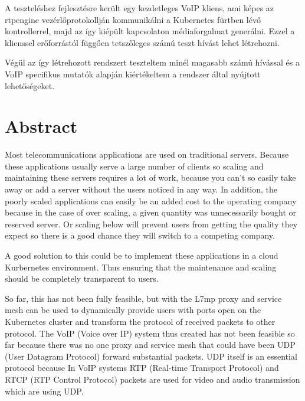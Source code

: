 A teszteléshez fejlesztésre került egy kezdetleges VoIP kliens, ami képes az 
rtpengine vezérlőprotokollján kommunikálni a Kubernetes fürtben lévő kontrollerrel, 
majd az így kiépült kapcsolaton médiaforgalmat generálni. Ezzel a klienssel 
erőforrástól függően tetszőleges számú teszt hívást lehet létrehozni. 

Végül az így létrehozott rendszert teszteltem minél magasabb számú hívással és a 
VoIP specifikus mutatók alapján kiértékeltem a rendszer által nyújtott lehetőségeket. 

\vfill
\selectenglish


\chapter*{Abstract}

Most telecommunications applications are used on traditional servers. Because these 
applications usually serve a large number of clients
so scaling and maintaining these servers requires a lot of work,
because you can’t so easily take away or add a server without the users noticed in
any way. In addition, the poorly scaled
applications can easily be an added cost to the operating company because
in the case of over scaling, a given quantity was unnecessarily bought or reserved
server. Or scaling below will prevent users from getting the quality they expect
so there is a good chance they will switch to a competing company.

A good solution to this could be to implement these applications
in a cloud Kurbernetes environment. Thus ensuring that the maintenance and
scaling should be completely transparent to users.

So far, this has not been fully feasible, but with the L7mp proxy and
service mesh can be used to dynamically provide users with ports
open on the Kubernetes cluster and transform the protocol of received packets to
other protocol. The VoIP (Voice over IP) system thus created has not been feasible so far 
because there was no one
proxy and service mesh that could have been UDP (User Datagram Protocol)
forward substantial packets. UDP itself is an essential protocol because
In VoIP systems RTP (Real-time Transport Protocol) and
RTCP (RTP Control Protocol) packets are used for video and
audio transmission which are using UDP.

